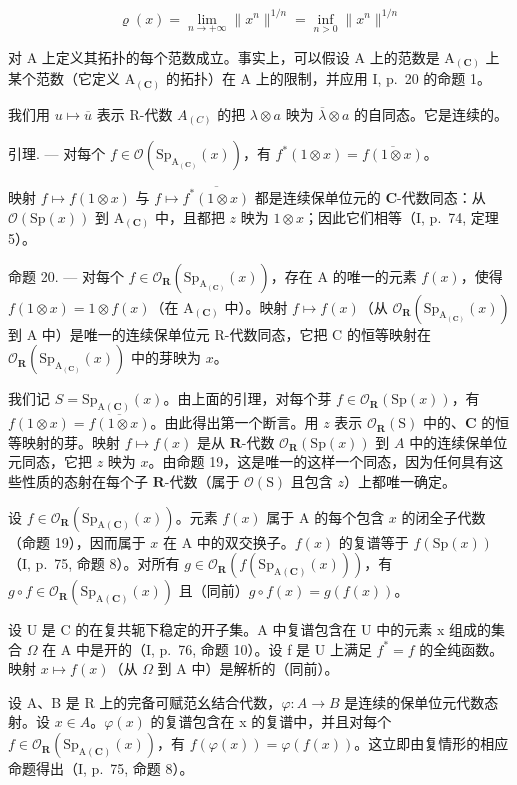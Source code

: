 \[
\varrho (x) = \lim _ {n \to + \infty} \| x ^ {n} \| ^ {1 / n} = \inf _ {n > 0} \| x ^ {n} \| ^ {1 / n}
\]

对 A 上定义其拓扑的每个范数成立。事实上，可以假设 A 上的范数是 \(\mathrm{A}_{(\mathbf{C})}\) 上某个范数（它定义 \(\mathrm{A}_{(\mathbf{C})}\) 的拓扑）在 A 上的限制，并应用 I, p.~20 的命题 1。

我们用 \(u \mapsto \overline{u}\) 表示 R-代数 \(A_{(C)}\) 的把 \(\lambda \otimes a\) 映为 \(\overline{\lambda} \otimes a\) 的自同态。它是连续的。

引理. --- 对每个 \(f \in \mathcal{O}(\mathrm{Sp}_{\mathrm{A}_{(\mathbf{C})}}(x))\)，有 \(f^{*}(1 \otimes x) = \overline{f(1 \otimes x)}\)。

映射 \(f \mapsto f(1 \otimes x)\) 与 \(f \mapsto \overline{f^*(1 \otimes x)}\) 都是连续保单位元的 \(\mathbf{C}\)-代数同态：从 \(\mathcal{O}(\mathrm{Sp}(x))\) 到 \(\mathrm{A}_{(\mathbf{C})}\) 中，且都把 \(z\) 映为 \(1 \otimes x\)；因此它们相等（I, p.~74, 定理 5）。

命题 20. --- 对每个 \(f \in \mathcal{O}_{\mathbf{R}}(\mathrm{Sp}_{\mathrm{A}_{(\mathbf{C})}}(x))\)，存在 A 的唯一的元素 \(f(x)\)，使得 \(f(1 \otimes x) = 1 \otimes f(x)\)（在 \(\mathrm{A}_{(\mathbf{C})}\) 中）。映射 \(f \mapsto f(x)\)（从 \(\mathcal{O}_{\mathbf{R}}(\mathrm{Sp}_{\mathrm{A}_{(\mathbf{C})}}(x))\) 到 A 中）是唯一的连续保单位元 R-代数同态，它把 C 的恒等映射在 \(\mathcal{O}_{\mathbf{R}}(\mathrm{Sp}_{\mathrm{A}_{(\mathbf{C})}}(x))\) 中的芽映为 \(x\)。

我们记 \(S = \text{Sp}_{\text{A}(\mathbf{C})}(x)\)。由上面的引理，对每个芽 \(f \in \mathcal{O}_{\mathbf{R}}(\text{Sp}(x))\)，有 \(f(1 \otimes x) = \overline{f(1 \otimes x)}\)。由此得出第一个断言。用 \(z\) 表示 \(\mathcal{O}_{\mathbf{R}}(\text{S})\) 中的、\(\mathbf{C}\) 的恒等映射的芽。映射 \(f \mapsto f(x)\) 是从 \(\mathbf{R}\)-代数 \(\mathcal{O}_{\mathbf{R}}(\text{Sp}(x))\) 到 \(A\) 中的连续保单位元同态，它把 \(z\) 映为 \(x\)。由命题 19，这是唯一的这样一个同态，因为任何具有这些性质的态射在每个子 \(\mathbf{R}\)-代数（属于 \(\mathcal{O}(\text{S})\) 且包含 \(z\)）上都唯一确定。

设 \(f \in \mathcal{O}_{\mathbf{R}}(\mathrm{Sp}_{\mathrm{A}(\mathbf{C})}(x))\)。元素 \(f(x)\) 属于 A 的每个包含 \(x\) 的闭全子代数（命题 19），因而属于 \(x\) 在 A 中的双交换子。\(f(x)\) 的复谱等于 \(f(\mathrm{Sp}(x))\)（I, p.~75, 命题 8）。对所有 \(g \in \mathcal{O}_{\mathbf{R}}(f(\mathrm{Sp}_{\mathrm{A}(\mathbf{C})}(x)))\)，有 \(g \circ f \in \mathcal{O}_{\mathbf{R}}(\mathrm{Sp}_{\mathrm{A}(\mathbf{C})}(x))\) 且（同前）\(g \circ f(x) = g(f(x))\)。

设 U 是 C 的在复共轭下稳定的开子集。A 中复谱包含在 U 中的元素 x 组成的集合 \(\Omega\) 在 A 中是开的（I, p.~76, 命题 10）。设 f 是 U 上满足 \(f^{*} = f\) 的全纯函数。映射 \(x \mapsto f(x)\)（从 \(\Omega\) 到 A 中）是解析的（同前）。

设 A、B 是 R 上的完备可赋范幺结合代数，\(\varphi\colon A\to B\) 是连续的保单位元代数态射。设 \(x\in A\)。\(\varphi(x)\) 的复谱包含在 x 的复谱中，并且对每个 \(f\in\mathcal{O}_{\mathbf{R}}(\mathrm{Sp}_{\mathrm{A}(\mathbf{C})}(x))\)，有 \(f(\varphi(x))=\varphi(f(x))\)。这立即由复情形的相应命题得出（I, p.~75, 命题 8）。

